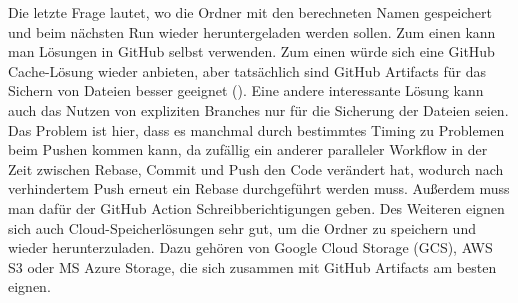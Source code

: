 Die letzte Frage lautet, wo die Ordner mit den berechneten Namen gespeichert und beim nächsten Run wieder heruntergeladen werden sollen.
Zum einen kann man Lösungen in GitHub selbst verwenden.
Zum einen würde sich eine GitHub Cache-Lösung wieder anbieten, aber tatsächlich sind GitHub Artifacts für das Sichern von Dateien besser geeignet (\cite{github_cache_doku}).
Eine andere interessante Lösung kann auch das Nutzen von expliziten Branches nur für die Sicherung der Dateien seien.
Das Problem ist hier, dass es manchmal durch bestimmtes Timing zu Problemen beim Pushen kommen kann, da zufällig ein anderer paralleler Workflow in der Zeit zwischen Rebase, Commit und Push den Code verändert hat, wodurch nach verhindertem Push erneut ein Rebase durchgeführt werden muss.
Außerdem muss man dafür der GitHub Action Schreibberichtigungen geben.
Des Weiteren eignen sich auch Cloud-Speicherlösungen sehr gut, um die Ordner zu speichern und wieder herunterzuladen.
Dazu gehören von Google Cloud Storage (GCS), AWS S3 oder MS Azure Storage, die sich zusammen mit GitHub Artifacts am besten eignen.